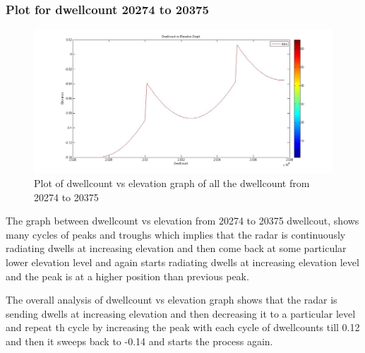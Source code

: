 \documentclass[14pt]{article} %
\begin{document}
   \subsubsection{Plot for dwellcount 20274 to 20375}
   \begin{figure}[H]
  \centerline{\includegraphics[width=\linewidth]{elevation(20000,20100).jpg}}
  \caption{Plot of dwellcount vs elevation graph of all the dwellcount from 20274 to 20375}
  \label{fig:figure 23(c)}
  \end{figure}
  \begin{tcolorbox}[title =\textbf{Analysis}]
  The graph  between dwellcount vs elevation from 20274 to 20375 dwellcout, shows many cycles of peaks and troughs which implies that the radar is continuously radiating dwells at increasing elevation and then come back at some particular lower elevation level and again starts radiating dwells at increasing elevation level and the peak is at a higher position than previous peak.
  \end{tcolorbox}
  \begin{tcolorbox}[colframe=red]
    The overall analysis of dwellcount vs elevation graph shows that the radar is sending  dwells at increasing elevation and then decreasing it to a particular level and repeat th cycle by increasing the peak with each cycle of dwellcounts till 0.12 and then it sweeps back to -0.14 and starts the process again.
   \end{tcolorbox}
\end{document}
